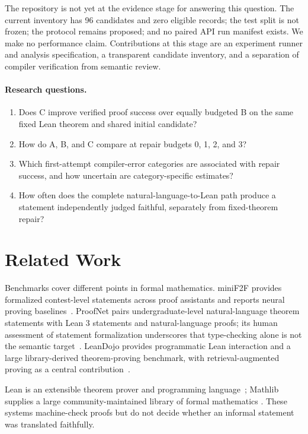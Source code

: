 \documentclass[runningheads,a4paper]{llncs}
\begin{document}
The repository is not yet at the evidence stage for answering this question.
The current inventory has 96 candidates and zero eligible records; the test
split is not frozen; the protocol remains proposed; and no paired API run
manifest exists. We make no performance claim. Contributions at this stage
are an experiment runner and analysis specification, a transparent candidate
inventory, and a separation of compiler verification from semantic review.

\paragraph{Research questions.}
\begin{enumerate}
\item Does C improve verified proof success over equally budgeted B on the
same fixed Lean theorem and shared initial candidate?
\item How do A, B, and C compare at repair budgets 0, 1, 2, and 3?
\item Which first-attempt compiler-error categories are associated with
repair success, and how uncertain are category-specific estimates?
\item How often does the complete natural-language-to-Lean path produce a
statement independently judged faithful, separately from fixed-theorem repair?
\end{enumerate}

\section{Related Work}
Benchmarks cover different points in formal mathematics. miniF2F provides
formalized contest-level statements across proof assistants and reports
neural proving baselines~\cite{zheng2022minif2f}. ProofNet pairs
undergraduate-level natural-language theorem statements with Lean 3 statements
and natural-language proofs; its human assessment of statement
formalization underscores that type-checking alone is not the semantic
target~\cite{azerbayev2023proofnet}. LeanDojo provides programmatic Lean
interaction and a large library-derived theorem-proving benchmark, with
retrieval-augmented proving as a central contribution~\cite{yang2023leandojo}.

Lean is an extensible theorem prover and programming language~\cite{demoura2021lean4};
Mathlib supplies a large community-maintained library of formal mathematics
\cite{mathlib2020}. These systems machine-check proofs but do not decide
whether an informal statement was translated faithfully.
\end{document}
